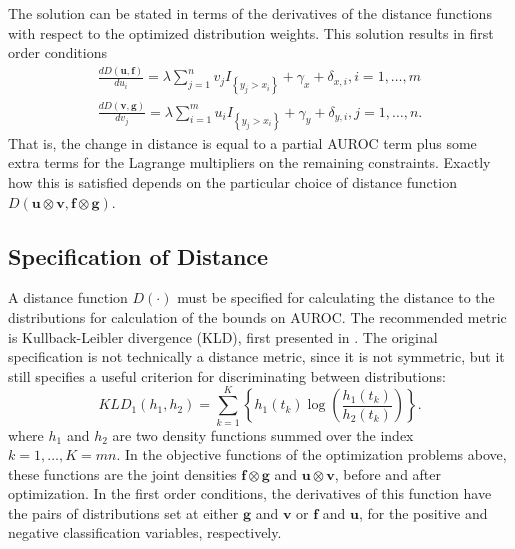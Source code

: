 
The solution can be stated in terms of the derivatives of the distance functions with respect to the optimized distribution weights.
%
This solution results in first order conditions
\begin{align}
    \frac{d D(\mathbf{u},\mathbf{f})}{d u_i} = \lambda \sum_{j = 1}^{n} v_j I_{\left\{ y_j > x_i \right\}} + \gamma_x + \delta_{x,i},
    i = 1, \dots, m \\
    \frac{d D(\mathbf{v},\mathbf{g})}{d v_j} = \lambda \sum_{i = 1}^{m} u_i I_{\left\{ y_j > x_i \right\}} + \gamma_y + \delta_{y,i},
    j = 1, \dots, n.
\end{align}
%
That is, the change in distance is equal to a partial AUROC term plus some extra terms for the Lagrange multipliers on the remaining constraints. Exactly how this is satisfied depends on the particular choice of distance function $D(\mathbf{u} \otimes \mathbf{v}, \mathbf{f} \otimes \mathbf{g})$.





\subsection{Specification of Distance}


A distance function $D(\cdot)$ must be specified for calculating the distance to the distributions for calculation of the bounds on AUROC.
%
%
The recommended metric is Kullback-Leibler divergence (KLD), first presented in \citet{kullbackliebler1951}.
%
The original specification is not technically a distance metric, since it is not symmetric, but 
% 
it still specifies a useful criterion for discriminating between distributions:
% 
%
% 
% 
% 
%
%
\begin{equation}
    KLD_1(h_1, h_2) = \sum_{k = 1}^{K} \left\{ h_1(t_k)
        \log \left( \frac{h_1(t_k)}{h_2(t_k)} \right) \right\}.
\end{equation}
%
% 
\noindent where $h_1$ and $h_2$ are two density functions summed over the index $k = 1, \dots, K = mn$.
In the objective functions of the optimization problems above, these functions are the joint densities
$\mathbf{f} \otimes \mathbf{g}$ and $\mathbf{u} \otimes \mathbf{v}$, before and after optimization.
In the first order conditions, the derivatives of this function have the pairs of distributions set at either
$\mathbf{g}$ and $\mathbf{v}$ or $\mathbf{f}$ and $\mathbf{u}$,
for the positive and negative classification variables, respectively.


